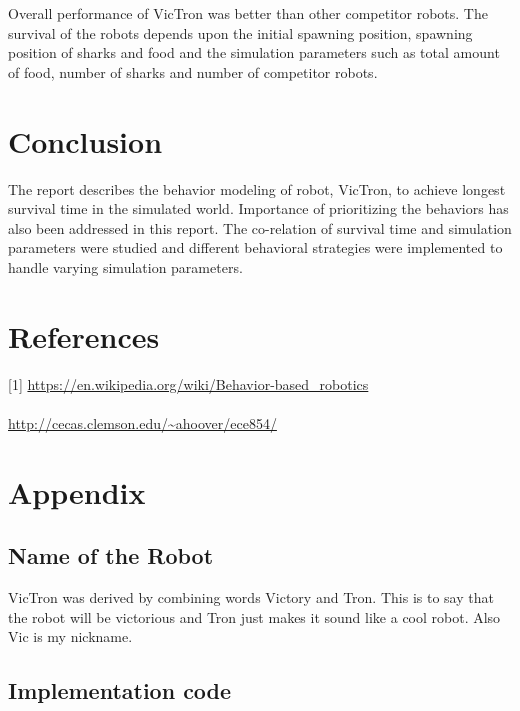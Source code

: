 \documentclass[12pt]{article}
\begin{document}
Overall performance of VicTron was better than other competitor robots. The survival of the robots depends upon the initial spawning position, spawning position of sharks and food and the simulation parameters such as total amount of food, number of sharks and number of competitor robots. 

\section{Conclusion}
The report describes the behavior modeling of robot, VicTron, to achieve longest survival time in the simulated world. Importance of prioritizing the behaviors has also been addressed in this report. The co-relation of survival time and simulation parameters were studied and different behavioral strategies were implemented to handle varying simulation parameters. 

\section*{References}
[1] \url{https://en.wikipedia.org/wiki/Behavior-based_robotics} \\
\\ \noindent
[2] \url{http://cecas.clemson.edu/~ahoover/ece854/}
\newpage
\section*{Appendix}

\subsection*{Name of the Robot}
VicTron was derived by combining words Victory and Tron. This is to say that the robot will be victorious and Tron just makes it sound like a cool robot. Also Vic is my nickname.

\subsection*{Implementation code}
\end{document}
